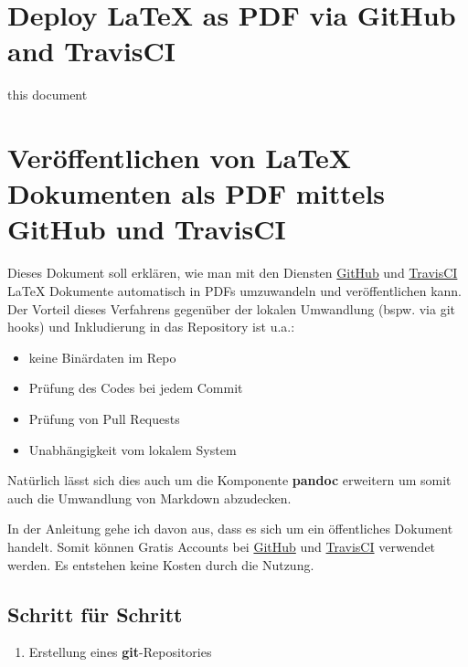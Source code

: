 \documentclass[]{article}
\date{}
\providecommand{\tightlist}{
  \setlength{\itemsep}{0pt}\setlength{\parskip}{0pt}}
\begin{document}
\section{Deploy LaTeX as PDF via GitHub and
TravisCI}\label{deploy-latex-as-pdf-via-github-and-travisci}

this document

\section{Veröffentlichen von LaTeX Dokumenten als PDF mittels GitHub und
TravisCI}\label{veruxf6ffentlichen-von-latex-dokumenten-als-pdf-mittels-github-und-travisci}

Dieses Dokument soll erklären, wie man mit den Diensten
\href{https://github.com/}{GitHub} und
\href{https://travis-ci.org/}{TravisCI} LaTeX Dokumente automatisch in
PDFs umzuwandeln und veröffentlichen kann. Der Vorteil dieses Verfahrens
gegenüber der lokalen Umwandlung (bspw. via git hooks) und Inkludierung
in das Repository ist u.a.:

\begin{itemize}
\tightlist
\item
  keine Binärdaten im Repo
\item
  Prüfung des Codes bei jedem Commit
\item
  Prüfung von Pull Requests
\item
  Unabhängigkeit vom lokalem System
\end{itemize}

Natürlich lässt sich dies auch um die Komponente \textbf{pandoc}
erweitern um somit auch die Umwandlung von Markdown abzudecken.

In der Anleitung gehe ich davon aus, dass es sich um ein öffentliches
Dokument handelt. Somit können Gratis Accounts bei
\href{https://github.com/}{GitHub} und
\href{https://travis-ci.org/}{TravisCI} verwendet werden. Es entstehen
keine Kosten durch die Nutzung.

\subsection{Schritt für Schritt}\label{schritt-fuxfcr-schritt}

\begin{enumerate}
\def\labelenumi{\arabic{enumi}.}
\tightlist
\item
  Erstellung eines \textbf{git}-Repositories
\end{enumerate}
\end{document}
